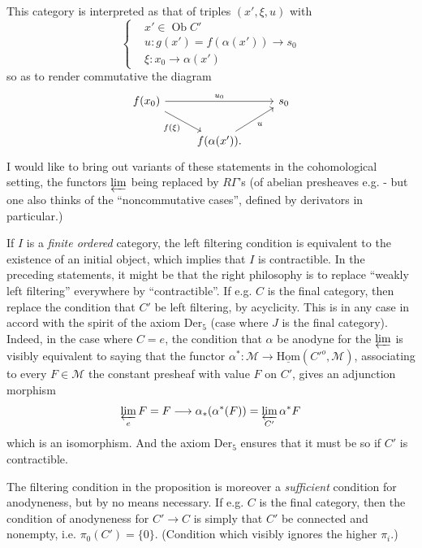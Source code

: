 
This category is interpreted as that of triples $(x', \xi, u)$ with
\[
\left\{
\begin{aligned}
& x' \in \operatorname{Ob} C' \\
& u : g(x') = f(\alpha(x')) \longrightarrow s_0 \\
& \xi : x_0 \longrightarrow \alpha(x')
\end{aligned}
\right.
\]
 so as to render commutative the diagram
\[
\begin{tikzcd}
f(x_0) \arrow[rr, "u_0"] \arrow[dr, "f(\xi)"'] & & s_0 \\
 & f(\alpha(x')). \arrow[ur, "u"'] &
\end{tikzcd}
\]
I would like to bring out variants of these statements in the cohomological setting, the functors $\varprojlim$ being replaced by $R\Gamma$'s (of abelian presheaves e.g. - but one also thinks of the ``noncommutative cases'', defined by derivators in particular.)

\clearpage


If $I$ is a \textit{finite ordered} category, the left filtering condition is equivalent to the existence of an initial object, which implies that $I$ is contractible. In the preceding statements, it might be that the right philosophy is to replace ``weakly left filtering'' everywhere by ``contractible''. If e.g. $C$ is the final category, then replace the condition that $C'$ be left filtering, by acyclicity. This is in any case in accord with the spirit of the axiom $\mathrm{Der}_5$ (case where $J$ is the final category). Indeed, in the case where $C = e$, the condition that $\alpha$ be anodyne for the $\varprojlim$ is visibly equivalent to saying that the functor $\alpha^* : \mathcal{M} \longrightarrow \underline{\mathrm{Hom}}(C'^{o}, \mathcal{M})$, associating to every $F \in \mathcal{M}$ the constant presheaf with value $F$ %
on $C'$, gives an adjunction morphism
\[ \varprojlim_{e} F = F \longrightarrow \alpha_*(\alpha^*(F)) = \varprojlim_{C'} \alpha^* F \]
which is an isomorphism. And the axiom $\mathrm{Der}_5$ ensures that it must be so if $C'$ is contractible.

The filtering condition in the proposition is moreover a \textit{sufficient} condition for anodyneness, but by no means necessary. If e.g. $C$ is the final category, then the condition of anodyneness for $C' \longrightarrow C$ is simply that $C'$ be connected and nonempty, i.e. $\pi_0(C') = \{0\}$. (Condition which visibly ignores the higher $\pi_i$.)

